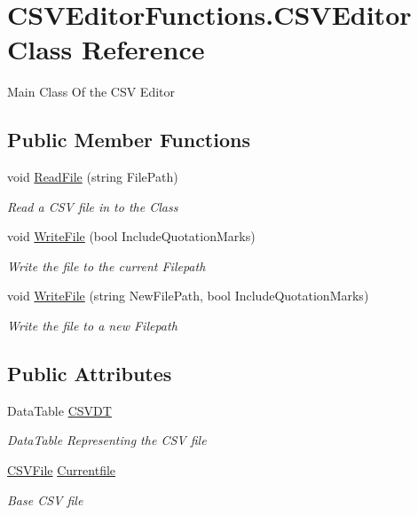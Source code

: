\hypertarget{class_c_s_v_editor_functions_1_1_c_s_v_editor}{}\section{C\+S\+V\+Editor\+Functions.\+C\+S\+V\+Editor Class Reference}
\label{class_c_s_v_editor_functions_1_1_c_s_v_editor}


Main Class Of the C\+SV Editor  


\subsection*{Public Member Functions}
\begin{DoxyCompactItemize}
\item 
void \mbox{\hyperlink{class_c_s_v_editor_functions_1_1_c_s_v_editor_a3e754b74dc2ef0897bce0b8edc762da7}{Read\+File}} (string File\+Path)
\begin{DoxyCompactList}\small\item\em Read a C\+SV file in to the Class \end{DoxyCompactList}\item 
void \mbox{\hyperlink{class_c_s_v_editor_functions_1_1_c_s_v_editor_a5a4cc8955ae7dd38cd00dfcb13463639}{Write\+File}} (bool Include\+Quotation\+Marks)
\begin{DoxyCompactList}\small\item\em Write the file to the current Filepath \end{DoxyCompactList}\item 
void \mbox{\hyperlink{class_c_s_v_editor_functions_1_1_c_s_v_editor_a5751e40d1d16cf755c0e828fc53614dd}{Write\+File}} (string New\+File\+Path, bool Include\+Quotation\+Marks)
\begin{DoxyCompactList}\small\item\em Write the file to a new Filepath \end{DoxyCompactList}\end{DoxyCompactItemize}
\subsection*{Public Attributes}
\begin{DoxyCompactItemize}
\item 
Data\+Table \mbox{\hyperlink{class_c_s_v_editor_functions_1_1_c_s_v_editor_a275aa6ff33508d362d66b13e79bbd4ba}{C\+S\+V\+DT}}
\begin{DoxyCompactList}\small\item\em Data\+Table Representing the C\+SV file \end{DoxyCompactList}\item 
\mbox{\hyperlink{class_c_s_v_editor_functions_1_1_c_s_v_file}{C\+S\+V\+File}} \mbox{\hyperlink{class_c_s_v_editor_functions_1_1_c_s_v_editor_ad426611ea71bd6214812f5ddf23646b4}{Currentfile}}
\begin{DoxyCompactList}\small\item\em Base C\+SV file \end{DoxyCompactList}\end{DoxyCompactItemize}


